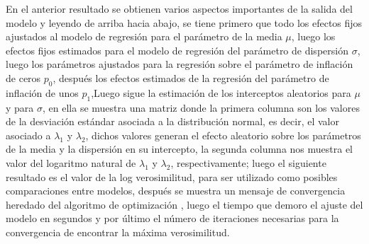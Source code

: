 En el anterior resultado se obtienen varios aspectos importantes de la salida del modelo y leyendo de arriba hacia abajo, se tiene primero que todo los efectos fijos ajustados al modelo de regresi\'{o}n para el par\'{a}metro de la media $\mu$, luego los efectos fijos estimados para el modelo de regresi\'{o}n del par\'{a}metro de dispersi\'{o}n $\sigma$, luego los par\'{a}metros ajustados para la regresi\'{o}n sobre el par\'{a}metro de inflaci\'{o}n de ceros $p_0$, despu\'{e}s los efectos estimados de la regresi\'{o}n del par\'{a}metro de inflaci\'{o}n de unos $p_1$,Luego sigue la estimaci\'{o}n de los interceptos aleatorios para $\mu$ y para $\sigma$, en ella se muestra una matriz donde la primera columna son los valores de la desviaci\'{o}n est\'{a}ndar asociada a la distribuci\'{o}n normal, es decir, el valor asociado a $\lambda_1$ y $\lambda_2$, dichos valores generan el efecto aleatorio sobre los par\'{a}metros de la media y la dispersi\'{o}n en su intercepto, la segunda columna nos muestra el valor del logaritmo natural de $\lambda_1$ y $\lambda_2$, respectivamente; luego el siguiente resultado es el valor de la log verosimilitud, para ser utilizado como posibles comparaciones entre modelos, despu\'{e}s se muestra un mensaje de convergencia heredado del algoritmo de optimizaci\'{o}n , luego el tiempo que demoro el ajuste del modelo en segundos y por \'{u}ltimo el n\'{u}mero de iteraciones necesarias para la convergencia de encontrar la m\'{a}xima verosimilitud.


